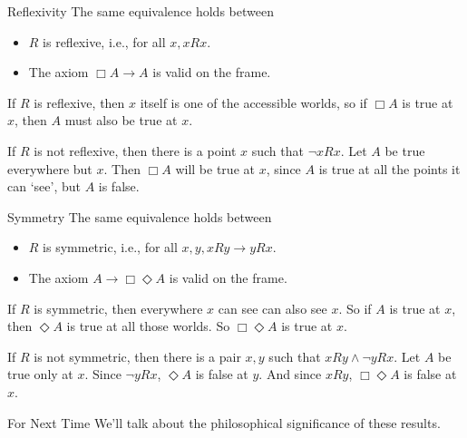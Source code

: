\documentclass[
  ignorenonframetext,
]{beamer}
\providecommand{\tightlist}{%
  \setlength{\itemsep}{0pt}\setlength{\parskip}{0pt}}
\renewcommand{\,}{\text{, }}
\begin{document}
\begin{frame}{Reflexivity}
\protect\hypertarget{reflexivity}{}
The same equivalence holds between

\begin{itemize}
\tightlist
\item
  \(R\) is reflexive, i.e., for all \(x, xRx\).
\item
  The axiom \(\Box A \rightarrow A\) is valid on the frame.
\end{itemize}

\begin{description}
\tightlist
\item[Left-to-right]
If \(R\) is reflexive, then \(x\) itself is one of the accessible
worlds, so if \(\Box A\) is true at \(x\), then \(A\) must also be true
at \(x\).
\item[Right-to-left]
If \(R\) is not reflexive, then there is a point \(x\) such that
\(\neg xRx\). Let \(A\) be true everywhere but \(x\). Then \(\Box A\)
will be true at \(x\), since \(A\) is true at all the points it can
`see', but \(A\) is false.
\end{description}
\end{frame}

\begin{frame}{Symmetry}
\protect\hypertarget{symmetry}{}
The same equivalence holds between

\begin{itemize}
\tightlist
\item
  \(R\) is symmetric, i.e., for all \(x, y, xRy \rightarrow yRx\).
\item
  The axiom \(A \rightarrow \Box \Diamond A\) is valid on the frame.
\end{itemize}

\begin{description}
\tightlist
\item[Left-to-right]
If \(R\) is symmetric, then everywhere \(x\) can see can also see \(x\).
So if \(A\) is true at \(x\), then \(\Diamond A\) is true at all those
worlds. So \(\Box \Diamond A\) is true at \(x\).
\item[Right-to-left]
If \(R\) is not symmetric, then there is a pair \(x, y\) such that
\(xRy \wedge \neg yRx\). Let \(A\) be true only at \(x\). Since
\(\neg yRx\), \(\Diamond A\) is false at \(y\). And since \(xRy\),
\(\Box \Diamond A\) is false at \(x\).
\end{description}
\end{frame}

\begin{frame}{For Next Time}
\protect\hypertarget{for-next-time}{}
We'll talk about the philosophical significance of these results.
\end{frame}
\end{document}
